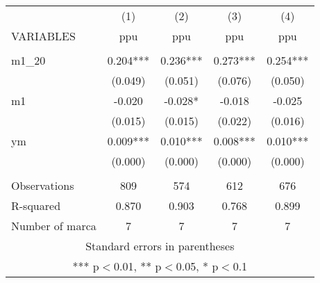 \begin{tabular}{lcccc} \hline
 & (1) & (2) & (3) & (4) \\
VARIABLES & ppu & ppu & ppu & ppu \\ \hline
 &  &  &  &  \\
m1\_20 & 0.204*** & 0.236*** & 0.273*** & 0.254*** \\
 & (0.049) & (0.051) & (0.076) & (0.050) \\
m1 & -0.020 & -0.028* & -0.018 & -0.025 \\
 & (0.015) & (0.015) & (0.022) & (0.016) \\
ym & 0.009*** & 0.010*** & 0.008*** & 0.010*** \\
 & (0.000) & (0.000) & (0.000) & (0.000) \\
 &  &  &  &  \\
Observations & 809 & 574 & 612 & 676 \\
R-squared & 0.870 & 0.903 & 0.768 & 0.899 \\
 Number of marca & 7 & 7 & 7 & 7 \\ \hline
\multicolumn{5}{c}{ Standard errors in parentheses} \\
\multicolumn{5}{c}{ *** p$<$0.01, ** p$<$0.05, * p$<$0.1} \\
\end{tabular}
